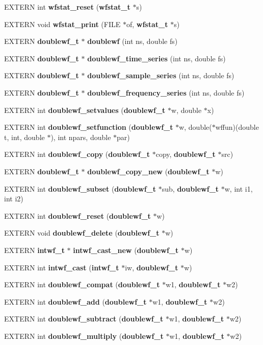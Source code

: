 \begin{CompactItemize}
\item 
EXTERN int {\bf wfstat\_\-reset} ({\bf wfstat\_\-t} $\ast$s)
\item 
EXTERN void {\bf wfstat\_\-print} (FILE $\ast$of, {\bf wfstat\_\-t} $\ast$s)
\item 
EXTERN {\bf doublewf\_\-t} $\ast$ {\bf doublewf} (int ns, double fs)
\item 
EXTERN {\bf doublewf\_\-t} $\ast$ {\bf doublewf\_\-time\_\-series} (int ns, double fs)
\item 
EXTERN {\bf doublewf\_\-t} $\ast$ {\bf doublewf\_\-sample\_\-series} (int ns, double fs)
\item 
EXTERN {\bf doublewf\_\-t} $\ast$ {\bf doublewf\_\-frequency\_\-series} (int ns, double fs)
\item 
EXTERN int {\bf doublewf\_\-setvalues} ({\bf doublewf\_\-t} $\ast$w, double $\ast$x)
\item 
EXTERN int {\bf doublewf\_\-setfunction} ({\bf doublewf\_\-t} $\ast$w, double($\ast$wffun)(double t, int, double $\ast$), int npars, double $\ast$par)
\item 
EXTERN int {\bf doublewf\_\-copy} ({\bf doublewf\_\-t} $\ast$copy, {\bf doublewf\_\-t} $\ast$src)
\item 
EXTERN {\bf doublewf\_\-t} $\ast$ {\bf doublewf\_\-copy\_\-new} ({\bf doublewf\_\-t} $\ast$w)
\item 
EXTERN int {\bf doublewf\_\-subset} ({\bf doublewf\_\-t} $\ast$sub, {\bf doublewf\_\-t} $\ast$w, int i1, int i2)
\item 
EXTERN int {\bf doublewf\_\-reset} ({\bf doublewf\_\-t} $\ast$w)
\item 
EXTERN void {\bf doublewf\_\-delete} ({\bf doublewf\_\-t} $\ast$w)
\item 
EXTERN {\bf intwf\_\-t} $\ast$ {\bf intwf\_\-cast\_\-new} ({\bf doublewf\_\-t} $\ast$w)
\item 
EXTERN int {\bf intwf\_\-cast} ({\bf intwf\_\-t} $\ast$iw, {\bf doublewf\_\-t} $\ast$w)
\item 
EXTERN int {\bf doublewf\_\-compat} ({\bf doublewf\_\-t} $\ast$w1, {\bf doublewf\_\-t} $\ast$w2)
\item 
EXTERN int {\bf doublewf\_\-add} ({\bf doublewf\_\-t} $\ast$w1, {\bf doublewf\_\-t} $\ast$w2)
\item 
EXTERN int {\bf doublewf\_\-subtract} ({\bf doublewf\_\-t} $\ast$w1, {\bf doublewf\_\-t} $\ast$w2)
\item 
EXTERN int {\bf doublewf\_\-multiply} ({\bf doublewf\_\-t} $\ast$w1, {\bf doublewf\_\-t} $\ast$w2)

\end{CompactItemize}
